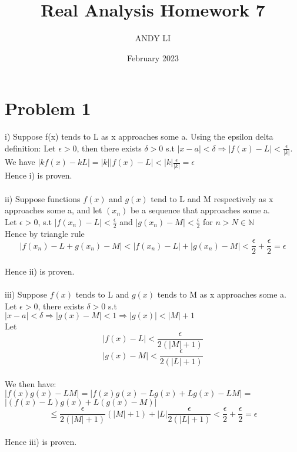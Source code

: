 \documentclass{article}
\title{Real Analysis Homework 7}
\author{ANDY LI}
\date{February 2023}
\begin{document}
\maketitle
\section*{Problem 1}
i) Suppose f(x) tends to L as x approaches some a. Using the epsilon delta definition: Let $\epsilon > 0$, then there exists $\delta > 0$ s.t $|x - a| < \delta \Rightarrow |f(x) - L| < \frac{\epsilon}{|k|}$.
\\We have $|kf(x) - kL| = |k||f(x)-L| < |k|\frac{\epsilon}{|k|} = \epsilon$
\\Hence i) is proven.
\\
\\ii) Suppose functions $f(x)$ and $g(x)$ tend to L and M respectively as x approaches some a, and let $(x_n)$ be a sequence that approaches some a.
\\Let $\epsilon > 0$, s.t $|f(x_n) - L| < \frac{\epsilon}{2}$ and $|g(x_n) - M| < \frac{\epsilon}{2}$ for $n > N \in \mathbb{N}$
\\Hence by triangle rule $$|f(x_n) - L + g(x_n) - M| < |f(x_n)-L| + |g(x_n) - M| < \frac{\epsilon}{2} + \frac{\epsilon}{2} = \epsilon$$
\\Hence ii) is proven.
\\
\\iii) Suppose $f(x)$ tends to L and $g(x)$ tends to M as x approaches some a.
\\Let $\epsilon > 0$, there exists $\delta > 0$ s.t $|x - a| < \delta \Rightarrow |g(x) - M| < 1 \Rightarrow |g(x)| < |M| + 1$
\\Let $$|f(x) - L| < \frac{\epsilon}{2(|M|+1)}$$ $$|g(x)-M| < \frac{\epsilon}{2(|L|+1)}$$
\\We then have: $|f(x)g(x) - LM| = |f(x)g(x) - Lg(x) + Lg(x) - LM| =$ \\$ |(f(x) - L)g(x) + L(g(x)-M)|$
$$\leq \frac{\epsilon}{2(|M|+1)}(|M|+1) + |L|\frac{\epsilon}{2(|L|+1)} < \frac{\epsilon}{2} + \frac{\epsilon}{2} = \epsilon$$
\\Hence iii) is proven.
\\
\end{document}
